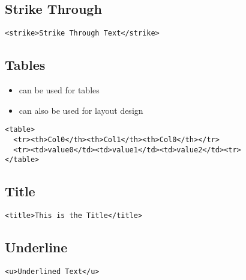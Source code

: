 \documentclass{article}
\begin{document}
\subsection{Strike Through}
\begin{lstlisting}
<strike>Strike Through Text</strike>
\end{lstlisting}

\subsection{Tables}
\begin{itemize}
  \item can be used for tables
  \item can also be used for layout design
\end{itemize}

\begin{lstlisting}
<table>
  <tr><th>Col0</th><th>Col1</th><th>Col0</th></tr>
  <tr><td>value0</td><td>value1</td><td>value2</td><tr>
</table>
\end{lstlisting}

\subsection{Title}
\begin{lstlisting}
<title>This is the Title</title>
\end{lstlisting}

\subsection{Underline}
\begin{lstlisting}
<u>Underlined Text</u>
\end{lstlisting}

\end{document}
